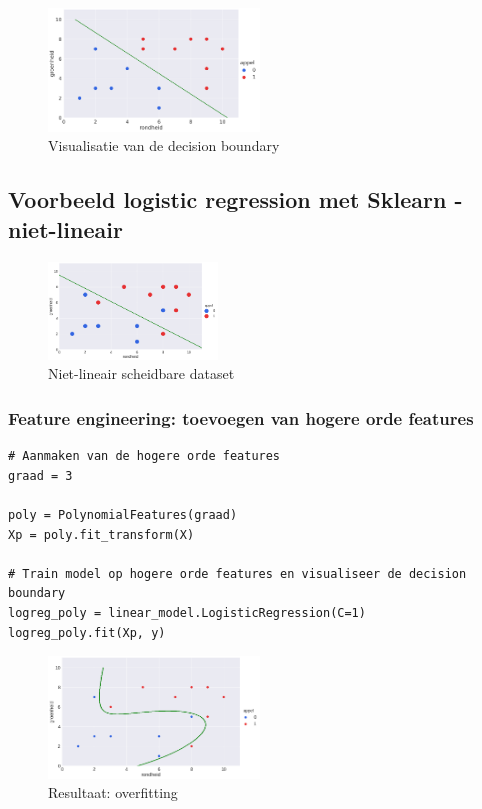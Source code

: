 \documentclass{article}
\begin{document}
\begin{figure}[H]
    \centering
    \includegraphics[width=0.5\textwidth]{logistic-sklearn-decision-boundary.png}
    \caption{Visualisatie van de decision boundary}
\end{figure}

\subsection{Voorbeeld logistic regression met Sklearn - niet-lineair}

\begin{figure}[H]
    \centering
    \includegraphics[width=0.4\textwidth]{logistic-non-linear.png}
    \caption{Niet-lineair scheidbare dataset}
\end{figure}

\subsubsection{Feature engineering: toevoegen van hogere orde features}

\begin{verbatim}
# Aanmaken van de hogere orde features
graad = 3

poly = PolynomialFeatures(graad)
Xp = poly.fit_transform(X)

# Train model op hogere orde features en visualiseer de decision boundary
logreg_poly = linear_model.LogisticRegression(C=1)
logreg_poly.fit(Xp, y)
\end{verbatim}

\begin{figure}[H]
    \centering
    \includegraphics[width=0.5\textwidth]{logistic-non-linear2.png}
    \caption{Resultaat: overfitting}
\end{figure}
\end{document}
